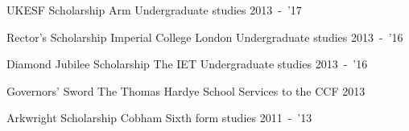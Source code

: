 \nopagebreak
\begin{cvawards}

\cvaward
  {UKESF Scholarship}
  {Arm}
  {Undergraduate studies}
  {2013~-~'17}

\cvaward
  {Rector's Scholarship}
  {Imperial College London}
  {Undergraduate studies}
  {2013~-~'16}

\cvaward
  {Diamond Jubilee Scholarship}
  {The IET}
  {Undergraduate studies}
  {2013~-~'16}

\cvaward
  {Governors' Sword}
  {The Thomas Hardye School}
  {Services to the CCF}
  {2013}

\cvaward
  {Arkwright Scholarship}
  {Cobham}
  {Sixth form studies}
  {2011~-~'13}

\end{cvawards}
